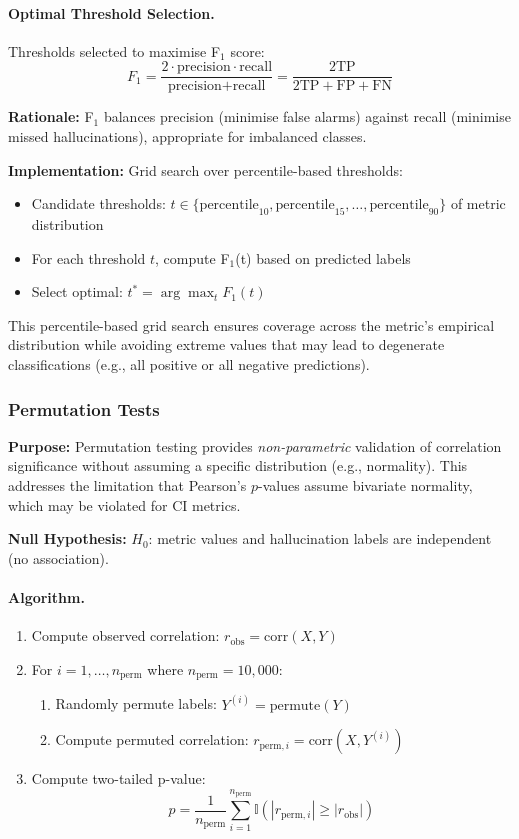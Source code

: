 \paragraph{Optimal Threshold Selection.} Thresholds selected to maximise F\(_1\) score:
\[
F_1 = \frac{2 \cdot \text{precision} \cdot \text{recall}}{\text{precision} + \text{recall}} = \frac{2\text{TP}}{2\text{TP} + \text{FP} + \text{FN}}
\]

\textbf{Rationale:} F\(_1\) balances precision (minimise false alarms) against recall (minimise missed hallucinations), appropriate for imbalanced classes.

\textbf{Implementation:} Grid search over percentile-based thresholds:
\begin{itemize}
    \item Candidate thresholds: \(t \in \{\text{percentile}_{10}, \text{percentile}_{15}, \ldots, \text{percentile}_{90}\}\) of metric distribution
    \item For each threshold \(t\), compute F\(_1\)(t) based on predicted labels
    \item Select optimal: \(t^* = \arg\max_t F_1(t)\)
\end{itemize}

This percentile-based grid search ensures coverage across the metric's empirical distribution while avoiding extreme values that may lead to degenerate classifications (e.g., all positive or all negative predictions).

\subsubsection{Permutation Tests}

\textbf{Purpose:} Permutation testing provides \textit{non-parametric} validation of correlation significance without assuming a specific distribution (e.g., normality). This addresses the limitation that Pearson's \(p\)-values assume bivariate normality, which may be violated for CI metrics.

\textbf{Null Hypothesis:} \(H_0\): metric values and hallucination labels are independent (no association).

\paragraph{Algorithm.}
\begin{enumerate}
    \item Compute observed correlation: \(r_{\text{obs}} = \text{corr}(X, Y)\)
    \item For \(i = 1, \ldots, n_{\text{perm}}\) where \(n_{\text{perm}} = 10{,}000\):
    \begin{enumerate}
        \item Randomly permute labels: \(Y^{(i)} = \text{permute}(Y)\)
        \item Compute permuted correlation: \(r_{\text{perm},i} = \text{corr}(X, Y^{(i)})\)
    \end{enumerate}
    \item Compute two-tailed p-value:
    \[
    p = \frac{1}{n_{\text{perm}}}\sum_{i=1}^{n_{\text{perm}}} \mathbb{I}(|r_{\text{perm},i}| \geq |r_{\text{obs}}|)
    \]
\end{enumerate}

